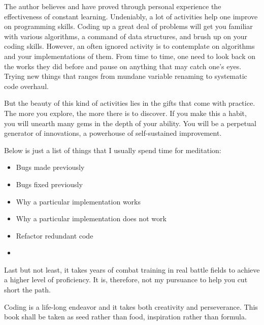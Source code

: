 \documentclass[oneside,11pt]{book}
\theoremstyle{definition}
\theoremstyle{remark}
\begin{document}
The author believes and have proved through personal experience the effectiveness of constant
learning.
Undeniably, a lot of activities help one improve on programming skills.
Coding up a great deal of problems will get you familiar with various algorithms, a command of
data structures, and brush up on your coding skills.
However, an often ignored activity is to contemplate on algorithms and your implementations of them.
From time to time, one need to look back on the works they did before and pause on
anything that may catch one's eyes.
Trying new things that ranges from mundane variable renaming to systematic code overhaul.

But the beauty of this kind of activities lies in the gifts that come with practice.
The more you explore, the more there is to discover.
If you make this a habit, you will unearth many gems in the depth of your ability.
You will be a perpetual generator of innovations, a powerhouse of self-sustained improvement.

Below is just a list of things that I usually spend time for meditation:
\begin{itemize}
    \item Bugs made previously
    \item Bugs fixed previously
    \item Why a particular implementation works
    \item Why a particular implementation does not work
    \item Refactor redundant code
    \item
\end{itemize}

Last but not least, it takes years of combat training in real battle fields to achieve a higher
level of proficiency.
It is, therefore, not my pursuance to help you cut short the path.


Coding is a life-long endeavor and it takes both creativity and perseverance.
This book shall be taken as seed rather than food, inspiration rather than formula.
\clearpage{}
    \printindex



\end{document}
